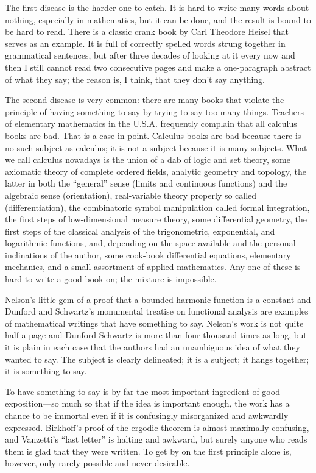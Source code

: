 \documentclass[12pt]{article}
\begin{document}
The first disease is the harder one to catch. It is hard to write many words about nothing, especially in mathematics, but it can be done, and the result is bound to be hard to read. There is a classic crank book by Carl Theodore Heisel \cite{heisel1934circle} that serves as an example. It is full of correctly spelled words strung together in grammatical sentences, but after three decades of looking at it every now and then I still cannot read two consecutive pages and make a one-paragraph abstract of what they say; the reason is, I think, that they don't say anything. 

The second disease is very common: there are many books that violate the principle of having something to say by trying to say too many things. Teachers of elementary mathematics in the U.S.A. frequently complain that all calculus books are bad. That is a case in point. Calculus books are bad because there is no such subject as calculus; it is not a subject because it is many subjects. What we call calculus nowadays is the union of a dab of logic and set theory, some axiomatic theory of complete ordered fields, analytic geometry and topology, the latter in both the ``general'' sense (limits and continuous functions) and the algebraic sense (orientation), real-variable theory properly so called (differentiation), the combinatoric symbol manipulation called formal integration, the first steps of low-dimensional measure theory, some differential geometry, the first steps of the classical analysis of the trigonometric, exponential, and logarithmic functions, and, depending on the space available and the personal inclinations of the author, some cook-book differential equations, elementary mechanics, and a small assortment of applied mathematics. Any one of these is hard to write a good book on; the mixture is impossible.

Nelson's little gem of a proof that a bounded harmonic function is a constant \cite{nelson1961proof} and Dunford and Schwartz's monumental treatise on functional analysis \cite{dunford1958linear} are examples of mathematical writings that have something to say. Nelson's work is not quite half a page and Dunford-Schwartz is more than four thousand times as long, but it is plain in each case that the authors had an unambiguous idea of what they wanted to say. The subject is clearly delineated; it is a subject; it hangs together; it is something to say. 

To have something to say is by far the most important ingredient of good exposition---so much so that if the idea is important enough, the work has a chance to be immortal even if it is confusingly misorganized and awkwardly expressed. Birkhoff's proof of the ergodic theorem \cite{birkhoff1931proof} is almost maximally confusing, and Vanzetti's ``last letter'' \cite{thurber1940male} is halting and awkward, but surely anyone who reads them is glad that they were written. To get by on the first principle alone is, however, only rarely possible and never desirable.
\end{document}
